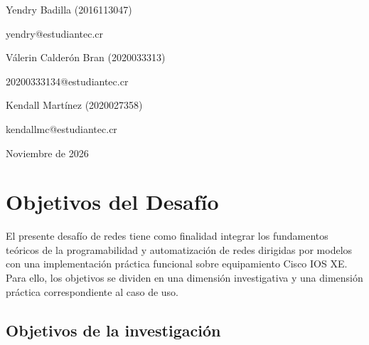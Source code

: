\documentclass[12pt,a4paper]{article}
\begin{document}
\begin{titlepage}
    \vspace{0.4cm}

    Yendry Badilla (2016113047)\\
    {\small yendry@estudiantec.cr\par}

    \vspace{0.4cm}

    Válerin Calderón Bran (2020033313)\\
    {\small 20200333134@estudiantec.cr\par}

    \vspace{0.4cm}

    Kendall Martínez (2020027358)\\
    {\small kendallmc@estudiantec.cr\par}

    \vfill

    {\large Noviembre de 2026\par}

    \vspace{0.3cm}

\end{titlepage}


\newpage
\singlespacing
\tableofcontents
\doublespacing
\newpage


\section{Objetivos del Desafío}

El presente desafío de redes tiene como finalidad integrar los fundamentos teóricos de la programabilidad y automatización de redes dirigidas por modelos con una implementación práctica funcional sobre equipamiento Cisco IOS XE. Para ello, los objetivos se dividen en una dimensión investigativa y una dimensión práctica correspondiente al caso de uso.

\subsection{Objetivos de la investigación}
\end{document}
